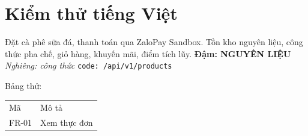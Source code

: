 \documentclass[12pt,a4paper]{article}
\begin{document}
\section{Kiểm thử tiếng Việt}
Đặt cà phê sữa đá, thanh toán qua ZaloPay Sandbox. Tồn kho nguyên liệu, công thức pha chế, giỏ hàng, khuyến mãi, điểm tích lũy.
\textbf{Đậm: NGUYÊN LIỆU} \textit{Nghiêng: công thức} \texttt{code: /api/v1/products}

Bảng thử:
\begin{tabular}{ll}
Mã & Mô tả \\
FR-01 & Xem thực đơn \\
\end{tabular}
\end{document}
